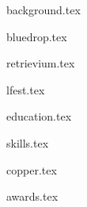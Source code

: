 \documentclass[11pt]{article}
\begin{document}
{background.tex}


{bluedrop.tex}

{retrievium.tex}

{lfest.tex}


{education.tex}


{skills.tex}


{copper.tex}


{awards.tex}
\end{document}

